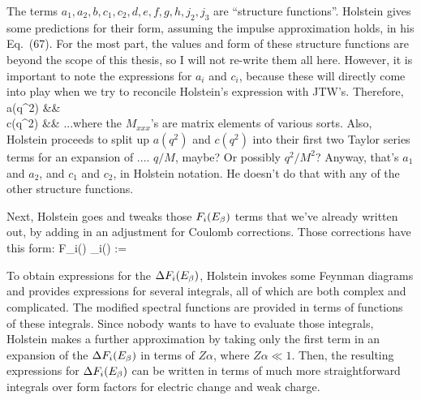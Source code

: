 The terms $a_1, a_2, b, c_1, c_2, d, e, f, g, h, j_2, j_3$ are ``structure functions''.  Holstein gives some predictions for their form, assuming the impulse approximation holds, in his Eq.~(67).   For the most part, the values and form of these structure functions are beyond the scope of this thesis, so I will not re-write them all here.     However, it is important to note the expressions for $a_i$ and $c_i$, because these will directly come into play when we try to reconcile Holstein's expression with JTW's.  Therefore, 
\bea
a(q^2) &\approx&   
\\ 
c(q^2) &\approx&  
\eea
...where the $M_{xxx}$'s are matrix elements of various sorts.    Also, Holstein proceeds to split up $a(q^2)$ and $c(q^2)$ into their first two Taylor series terms for an expansion of .... $q/M$, maybe?  Or possibly $q^2 / M^2$?  Anyway, that's $a_1$ and $a_2$, and $c_1$ and $c_2$, in Holstein notation.  He doesn't do that with any of the other structure functions. 


Next, Holstein goes and tweaks those $F_i(E_{\beta})$ terms that we've already written out, by adding in an adjustment for Coulomb corrections.  Those corrections have this form:
\beq
	F_i(\Ebeta) \rightarrow {}_i(\Ebeta) := \FF {}
\eeq

To obtain expressions for the $\Delta F_i(E_{\beta})$, Holstein invokes some Feynman diagrams and provides expressions for several integrals, all of which are both complex and complicated.  The modified spectral functions are provided in terms of functions of these integrals.  Since nobody wants to have to evaluate those integrals, Holstein makes a further approximation by taking only the first term in an expansion of the $\Delta F_i(E_{\beta})$ in terms of $Z\alpha$, where $Z\alpha \ll 1$.  Then, the resulting expressions for $\Delta F_i(E_{\beta})$ can be written in terms of much more straightforward integrals over form factors for electric change and weak charge.  

